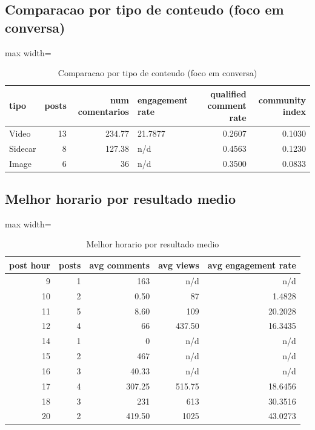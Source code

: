 \documentclass[12pt,a4paper]{article}
\begin{document}
\subsection{Comparacao por tipo de conteudo (foco em conversa)}
\begin{table}[H]
\centering
\scriptsize
\begin{adjustbox}{max width=\textwidth}
\begin{tabular}{l r r l r r}
\toprule
tipo & posts & num comentarios & engagement rate & qualified comment rate & community index \\
\midrule
Video & 13 & 234.77 & 21.7877 & 0.2607 & 0.1030 \\
Sidecar & 8 & 127.38 & n/d & 0.4563 & 0.1230 \\
Image & 6 & 36 & n/d & 0.3500 & 0.0833 \\
\bottomrule
\end{tabular}
\end{adjustbox}
\caption{Comparacao por tipo de conteudo (foco em conversa)}
\label{tab:tipo}
\end{table}

\subsection{Melhor horario por resultado medio}
\begin{table}[H]
\centering
\scriptsize
\begin{adjustbox}{max width=\textwidth}
\begin{tabular}{r r r r r}
\toprule
post hour & posts & avg comments & avg views & avg engagement rate \\
\midrule
9 & 1 & 163 & n/d & n/d \\
10 & 2 & 0.50 & 87 & 1.4828 \\
11 & 5 & 8.60 & 109 & 20.2028 \\
12 & 4 & 66 & 437.50 & 16.3435 \\
14 & 1 & 0 & n/d & n/d \\
15 & 2 & 467 & n/d & n/d \\
16 & 3 & 40.33 & n/d & n/d \\
17 & 4 & 307.25 & 515.75 & 18.6456 \\
18 & 3 & 231 & 613 & 30.3516 \\
20 & 2 & 419.50 & 1025 & 43.0273 \\
\bottomrule
\end{tabular}
\end{adjustbox}
\caption{Melhor horario por resultado medio}
\label{tab:hora}
\end{table}
\end{document}

